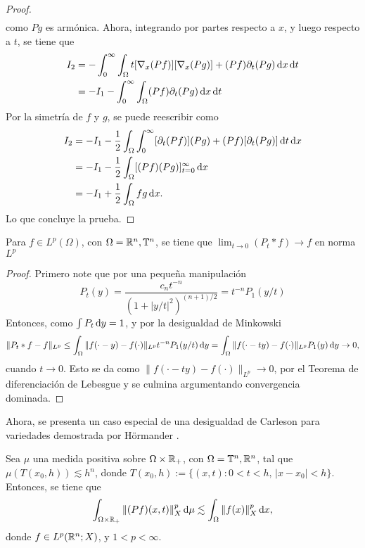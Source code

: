 \begin{proof}
\begin{align*}
	\end{align*}
	como $Pg$ es armónica. Ahora, integrando por partes respecto a $x$, y luego respecto a $t$, se tiene que
	\begin{align*}
		I_2 & = - \int_0^\infty \int_{\Omega}   t [\nabla_x(Pf)][\nabla_x(Pg)]+(Pf)\partial_t(Pg)\mathop{}\!\mathrm{d} x \mathop{}\!\mathrm{d} t \\
		& = -I_1 - \int_0^\infty \int_{\Omega} (Pf)\partial_t(Pg)\mathop{}\!\mathrm{d} x \mathop{}\!\mathrm{d} t 
	\end{align*}
	Por la simetría de $f$ y $g$, se puede reescribir como 
	\begin{align*}
		I_2 & =  - I_1 -\frac{1}{2}\int_{\Omega}  \int_0^\infty [\partial_t(Pf)](Pg) + (Pf)[\partial_t(Pg)]\mathop{}\!\mathrm{d} t \mathop{}\!\mathrm{d} x \\
		& =  - I_1 -\frac{1}{2}\int_{\Omega} [(Pf)(Pg)]_{t=0}^\infty \mathop{}\!\mathrm{d} x \\
		&= -I_1 + \frac{1}{2}\int_{\Omega}fg\mathop{}\!\mathrm{d} x.
	\end{align*}
	Lo que concluye la prueba.
\end{proof}
\begin{theorem}
	Para $f \in L^p(\Omega)$, con $\Omega=\mathbb{R}^n, \mathbb{T}^n$, se tiene que $\lim_{t\to0}(P_t*f) \to f$ en norma $L^p$
\end{theorem}
\begin{proof}
	Primero note que por una pequeña manipulación
	\begin{equation*}
		P_t(y) = \frac{c_nt^{-n}}{(1+|y/t|^2)^{(n+1)/2}} = t^{-n}P_1(y/t)
	\end{equation*}
	Entonces, como $\int P_t \mathop{}\!\mathrm{d} y = 1$, y por la desigualdad de Minkowski
	\begin{equation*}
		\|P_t*f - f\|_{L^p} \leq \int_{\Omega} \|f(\cdot-y)-f(\cdot)\|_{L^p} t^{-n}P_1(y/t) \mathop{}\!\mathrm{d} y = \int_{\Omega} \|f(\cdot-ty)-f(\cdot)\|_{L^p} P_1(y) \mathop{}\!\mathrm{d} y \to 0,
	\end{equation*}
	cuando $t\to0$. Esto se da como $\|f(\cdot-ty)-f(\cdot)\|_{L^p} \to 0$, por el Teorema de diferenciación de Lebesgue y se culmina argumentando convergencia dominada.
\end{proof}
Ahora, se presenta un caso especial de una desigualdad de Carleson para variedades demostrada por Hörmander \cite{hormander1967}.
\begin{lemma}\label{lem:Carleson}
	Sea $\mu$ una medida positiva sobre $\Omega\times\mathbb{R}_+$, con $\Omega=\mathbb{T}^n,\mathbb{R}^n$, tal que $\mu(T(x_0, h))\lesssim h^n$, donde $T(x_0, h) := \{(x, t): 0<t<h, \, |x-x_0| < h\}$. Entonces, se tiene que 
	\begin{equation*}
		\int_{\Omega\times\mathbb{R}_+} \|(Pf)(x, t)\|_X^p \mathop{}\!\mathrm{d} \mu \lesssim \int_{\Omega} \|f(x)\|_X^p\mathop{}\!\mathrm{d} x,
	\end{equation*}
	donde $f\in L^p(\mathbb{R}^n;X)$, y $1<p<\infty$.
\end{lemma}
